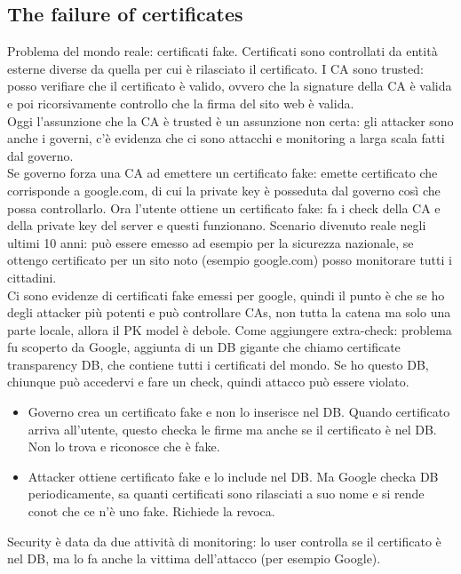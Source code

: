 \documentclass[16px]{article}
\begin{document}
\subsection{The failure of certificates}
Problema del mondo reale: certificati fake. Certificati sono controllati da entità esterne diverse da quella per cui è rilasciato il certificato. I CA sono trusted: posso verifiare che il certificato è valido, ovvero che la signature della CA è valida e poi ricorsivamente controllo che la firma del sito web è valida.\\ Oggi l'assunzione che la CA è trusted è un assunzione non certa: gli attacker sono anche i governi, c'è evidenza che ci sono attacchi e monitoring a larga scala fatti dal governo.\\ Se governo forza una CA ad emettere un certificato fake: emette certificato che corrisponde a google.com, di cui la private key è posseduta dal governo così che possa controllarlo. Ora l'utente ottiene un certificato fake: fa i check della CA e della private key del server e questi funzionano. Scenario divenuto reale negli ultimi 10 anni: può essere emesso ad esempio per la sicurezza nazionale, se ottengo certificato per un sito noto (esempio google.com) posso monitorare tutti i cittadini.\\ Ci sono evidenze di certificati fake emessi per google, quindi il punto è che se ho degli attacker più potenti e può controllare CAs, non tutta la catena ma solo una parte locale, allora il PK model è debole. Come aggiungere extra-check: problema fu scoperto da Google, aggiunta di un DB gigante che chiamo certificate transparency DB, che contiene tutti i certificati del mondo. Se ho questo DB, chiunque può accedervi e fare un check, quindi attacco può essere violato. 
\begin{itemize}
\item Governo crea un certificato fake e non lo inserisce nel DB. Quando certificato arriva all'utente, questo checka le firme ma anche se il certificato è nel DB. Non lo trova e riconosce che è fake.
\item Attacker ottiene certificato fake e lo include nel DB. Ma Google checka DB periodicamente, sa quanti certificati sono rilasciati a suo nome e si rende conot che ce n'è uno fake. Richiede la revoca.
\end{itemize}
Security è data da due attività di monitoring: lo user controlla se il certificato è nel DB, ma lo fa anche la vittima dell'attacco (per esempio Google).
\end{document}
